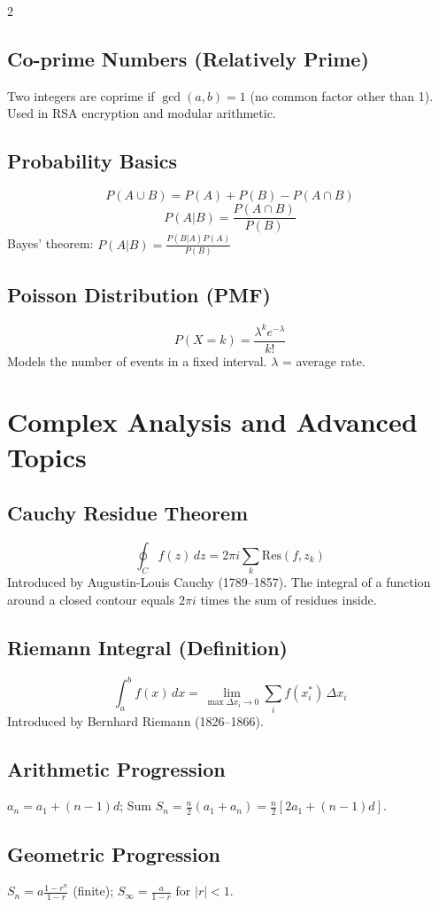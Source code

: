\documentclass[10pt,a4paper]{article}
\begin{document}
\begin{multicols}{2}
\subsection{Co-prime Numbers (Relatively Prime)}
Two integers are coprime if $\gcd(a,b) = 1$ (no common factor other than 1). Used in RSA encryption and modular arithmetic.

\subsection{Probability Basics}
\[
P(A \cup B) = P(A) + P(B) - P(A \cap B)
\]
\[
P(A|B) = \frac{P(A \cap B)}{P(B)}
\]
Bayes' theorem: $P(A|B) = \frac{P(B|A)P(A)}{P(B)}$

\subsection{Poisson Distribution (PMF)}
\[
P(X=k) = \frac{\lambda^k e^{-\lambda}}{k!}
\]
Models the number of events in a fixed interval. $\lambda$ = average rate.

\section{Complex Analysis and Advanced Topics}

\subsection{Cauchy Residue Theorem}
\[
\oint_C f(z)\,dz = 2\pi i \sum_k \text{Res}(f, z_k)
\]
Introduced by Augustin-Louis Cauchy (1789--1857). The integral of a function around a closed contour equals $2\pi i$ times the sum of residues inside.

\subsection{Riemann Integral (Definition)}
\[
\int_a^b f(x)\,dx = \lim_{\max\Delta x_i \to 0} \sum_i f(x_i^*)\,\Delta x_i
\]
Introduced by Bernhard Riemann (1826--1866).

\subsection{Arithmetic Progression}
$a_n = a_1 + (n-1)d$; Sum $S_n = \frac{n}{2}(a_1 + a_n) = \frac{n}{2}[2a_1 + (n-1)d]$.

\subsection{Geometric Progression}
$S_n = a\frac{1-r^n}{1-r}$ (finite); $S_\infty = \frac{a}{1-r}$ for $|r| < 1$.


\end{multicols}
\end{document}
